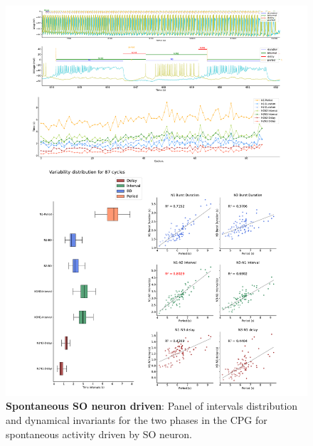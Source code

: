  
\begin{figure}[htbp]
	\centering
	\includegraphics[width=\textwidth]{./invariants/data/SUSSEX/prep4_so_driven_2/images/panel_with_intervals.pdf}
	\caption{\textbf{Spontaneous SO neuron driven}: Panel of intervals distribution and dynamical invariants for the two phases in the CPG for spontaneous activity driven by SO neuron.}
	\label{fig:so spontaneous invariants 2}
\end{figure}

% 	


